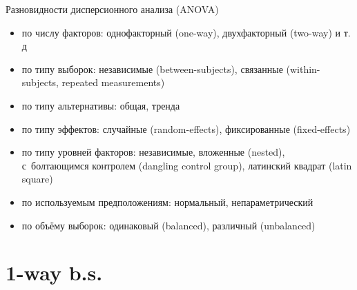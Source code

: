 \documentclass[9pt,pdf,utf8,hyperref={unicode},aspectratio=169]{beamer}
\begin{document}
\begin{frame}{Разновидности дисперсионного анализа (ANOVA)}
    \begin{itemize}
    \item по числу факторов: однофакторный (one-way), двухфакторный (two-way) и т.\,д
    \item по типу выборок: независимые (between-subjects), связанные (within-subjects, repeated measurements)
    \item по типу альтернативы: общая, тренда
    \item по типу эффектов: случайные (random-effects), фиксированные (fixed-effects)
    \item по типу уровней факторов: независимые, вложенные (nested), с~болтающимся контролем (dangling control group), латинский квадрат (latin square)
	\item по используемым предположениям: нормальный, непараметрический 
	\item по объёму выборок: одинаковый (balanced), различный (unbalanced)
    \end{itemize}
\end{frame}


\section{1-way b.s.}
\end{document}
